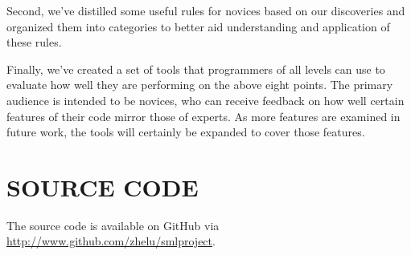 \documentclass[12pt,abstracton]{scrartcl}
\begin{document}
Second, we've distilled some useful rules for novices based
on our discoveries and organized them into categories
to better aid understanding and application of these rules.

Finally, we've created a set of tools that programmers of all levels
can use to evaluate how well they are performing on the above
eight points. The primary audience is intended to be novices,
who can receive feedback on how well certain features
of their code mirror those of experts. As more features are examined
in future work, the tools will certainly be expanded to cover those
features.
\section*{SOURCE CODE}
The source code is available on GitHub via \url{http://www.github.com/zhelu/smlproject}.
\end{document}
